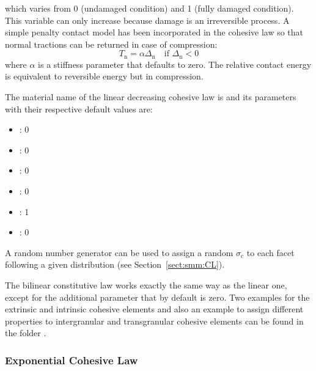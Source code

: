 which varies from 0 (undamaged condition) and 1 (fully
damaged condition). This variable can only increase because damage is
an irreversible process. A simple penalty contact model has been incorporated
in the cohesive law so that normal tractions can be returned in
case of compression:
\begin{equation}
  T_\mathrm{n} = \alpha \Delta_\mathrm{n} \quad\text{if
    $\Delta_\mathrm{n} < 0$}
\end{equation}
where $\alpha$ is a stiffness parameter that defaults to zero. The
relative contact energy is equivalent to reversible energy but in
compression.

The material name of the linear decreasing cohesive law  is
 and its parameters with their
respective default values are:
\begin{itemize}
\item {}: 0
\item {}: 0
\item {}: 0
\item {}: 0
\item {}: 1
\item {}: 0
\end{itemize}
A random number generator can be used to assign a random
$\sigma_\mathrm{c}$ to each facet following a given
distribution (see Section~\ref{sect:smm:CL}).

The bilinear constitutive law works exactly the same way as the linear
one, except for the additional parameter  that by
default is zero. Two examples for the extrinsic and intrinsic cohesive
elements and also an example to assign different properties to
intergranular and transgranular cohesive elements can be found in
the folder .

\subsubsection{Exponential Cohesive Law}

